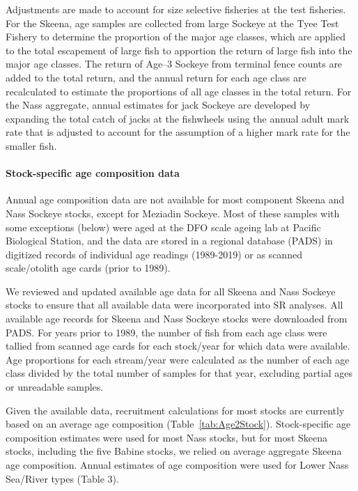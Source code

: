\documentclass[french,11pt]{book}
\begin{document}
Adjustments are made to account for size selective fisheries at the test fisheries. For the Skeena, age samples are collected from large Sockeye at the Tyee Test Fishery to determine the proportion of the major age classes, which are applied to the total escapement of large fish to apportion the return of large fish into the major age classes. The return of Age--3 Sockeye from terminal fence counts are added to the total return, and the annual return for each age class are recalculated to estimate the proportions of all age classes in the total return. For the Nass aggregate, annual estimates for jack Sockeye are developed by expanding the total catch of jacks at the fishwheels using the annual adult mark rate that is adjusted to account for the assumption of a higher mark rate for the smaller fish.

\paragraph{Stock-specific age composition data}\label{stock-specific-age-composition-data}

Annual age composition data are not available for most component Skeena and Nass Sockeye stocks, except for Meziadin Sockeye. Most of these samples with some exceptions (below) were aged at the DFO scale ageing lab at Pacific Biological Station, and the data are stored in a regional database (PADS) in digitized records of individual age readings (1989-2019) or as scanned scale/otolith age cards (prior to 1989).

We reviewed and updated available age data for all Skeena and Nass Sockeye stocks to ensure that all available data were incorporated into SR analyses. All available age records for Skeena and Nass Sockeye stocks were downloaded from PADS. For years prior to 1989, the number of fish from each age class were tallied from scanned age cards for each stock/year for which data were available. Age proportions for each stream/year were calculated as the number of each age class divided by the total number of samples for that year, excluding partial ages or unreadable samples.

Given the available data, recruitment calculations for most stocks are currently based on an average age composition (Table~\ref{tab:Age2Stock}). Stock-specific age composition estimates were used for most Nass stocks, but for most Skeena stocks, including the five Babine stocks, we relied on average aggregate Skeena age composition. Annual estimates of age composition were used for Lower Nass Sea/River types (Table 3).
\end{document}
